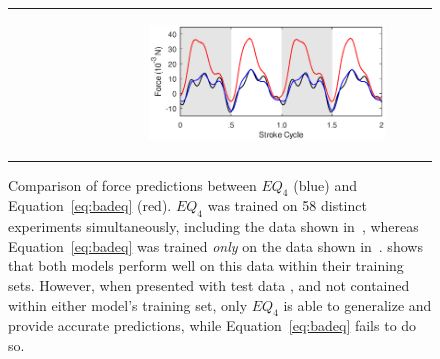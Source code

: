 \documentclass[fleqn,10pt]{wlscirep}
\begin{document}
\begin{figure}[ht]
\begin{tabular}{cc}
\begin{subfigure}{0.48\textwidth}
\caption{\label{fig:eq_goodbad_3}}
\end{subfigure} &
\begin{subfigure}{0.48\textwidth}
\centering
\includegraphics[width=\textwidth]{figures/eq_goodbad_4}
\caption{\label{fig:eq_goodbad_4}}
\end{subfigure}
\end{tabular}
\caption{Comparison of force predictions between $EQ_4$ (blue) and
Equation~\eqref{eq:badeq} (red). $EQ_4$ was trained on 58 distinct experiments
simultaneously, including the data shown in~, whereas
Equation~\eqref{eq:badeq} was trained \emph{only} on the data shown
in~.   shows that both models
perform well on this data within their training sets.  However, when presented
with test data ,  and
 not contained within either model's training set, only $EQ_4$ is able to
generalize and provide accurate predictions, while Equation~\eqref{eq:badeq}
fails to do so.}
\label{fig:eq_goodbad}
\end{figure}
\end{document}
